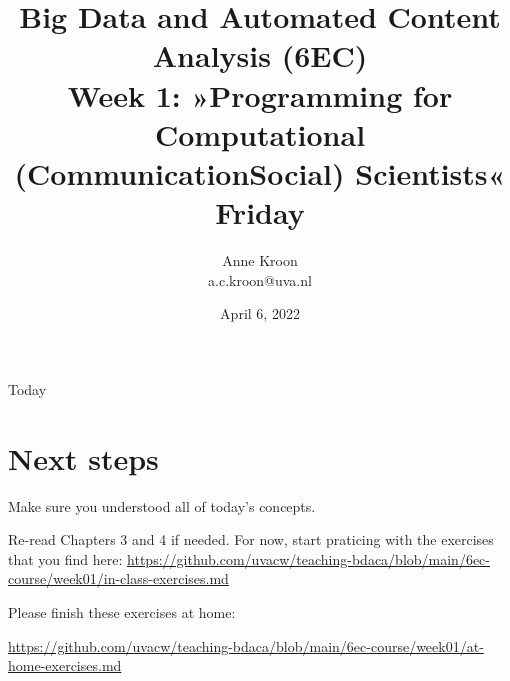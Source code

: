 

\graphicspath{{../../resources/img/}}




\title[Big Data and Automated Content Analysis]{\textbf{Big Data and Automated Content Analysis (6EC)} 
\\Week 1: »Programming for Computational (Communication\textbar Social) Scientists«
\\Friday }
\author[Anne Kroon]{Anne Kroon\\ \footnotesize{a.c.kroon@uva.nl}}
\date{April 6, 2022}

\begin{frame}{}
	\titlepage
\end{frame}

\begin{frame}{Today}
	\tableofcontents
\end{frame}






\section{Next steps}


\begin{frame}[standout]
Make sure you understood all of today's concepts.

Re-read Chapters 3 and 4 if needed.
For now, start praticing with the exercises that you find here:
\large{\url{https://github.com/uvacw/teaching-bdaca/blob/main/6ec-course/week01/in-class-exercises.md}}

Please finish these exercises at home: 

\large{\url{https://github.com/uvacw/teaching-bdaca/blob/main/6ec-course/week01/at-home-exercises.md}}
\end{frame}


\begin{frame}
	\printbibliography
\end{frame}


